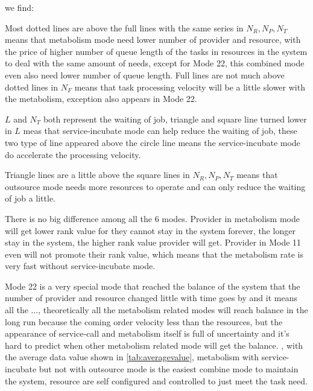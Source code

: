 we find: \begin{inparaenum}[1)]
\item Most dotted lines are above the full lines with the same series in $N_R,N_P,N_T$ means that metabolism mode need lower number of provider and resource, with the price of higher number of queue length of the tasks in resources in the system to deal with the same amount of needs, except for Mode 22, this combined mode even also need lower number of queue length. Full lines are not much above dotted lines in $N_F$ means that task processing velocity will be a little slower with the metabolism, exception also appears in Mode 22. 
\item $L$ and $N_T$ both represent the waiting of job, triangle and square line turned lower in $L$ meas that service-incubate mode can help reduce the waiting of job, these two type of line appeared above the circle line means the service-incubate mode do accelerate the processing velocity.
\item Triangle lines are a little above the square lines in $N_R,N_P,N_T$ means that outsource mode needs more resources to operate and can only reduce the waiting of job a little.
\item There is no big difference among all the 6 modes. Provider in metabolism mode will get lower rank value for they cannot stay in the system forever, the longer stay in the system, the higher rank value provider will get. Provider in Mode 11 even will not promote their rank value, which means that the metabolism rate is very fast without service-incubate mode.
\item Mode 22 is a very special mode that reached the balance of the system that the number of provider and resource changed little with time goes by and it means all the ..., theoretically all the metabolism related modes will reach balance in the long run because the coming order velocity less than the resources, but the appearance of service-call and metabolism itself is full of uncertainty and it's hard to predict when other metabolism related mode will get the balance. , with the average data value shown in \autoref{tab:averagevalue}, metabolism with service-incubate but not with outsource mode is the easiest combine mode to maintain the system, resource are self configured and controlled to just meet the task need.
\end{inparaenum}

